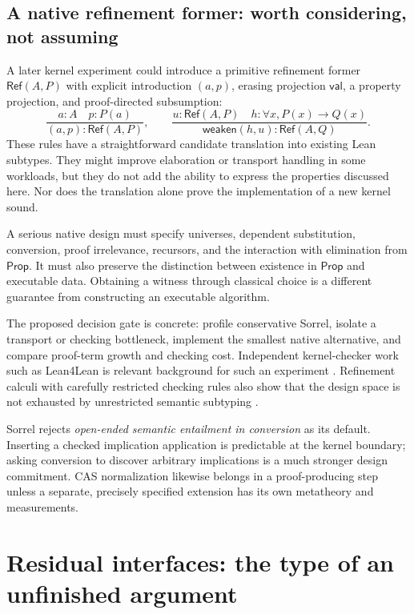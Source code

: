 \documentclass[11pt,a4paper]{article}
\newcommand{\Prop}{\mathsf{Prop}}\newcommand{\Type}{\mathsf{Type}}
\numberwithin{equation}{section}
\theoremstyle{definition}\newtheorem{definition}[theorem]{Definition}
\theoremstyle{remark}\newtheorem{remark}[theorem]{Remark}
\begin{document}
\subsection{A native refinement former: worth considering, not assuming}
A later kernel experiment could introduce a primitive refinement former
\(\mathsf{Ref}(A,P)\) with explicit introduction \((a,p)\), erasing projection
\(\mathsf{val}\), a property projection, and proof-directed subsumption:
\[
 \frac{a:A\quad p:P(a)}{(a,p):\mathsf{Ref}(A,P)},\qquad
 \frac{u:\mathsf{Ref}(A,P)\quad h:\forall x,P(x)\to Q(x)}
      {\mathsf{weaken}(h,u):\mathsf{Ref}(A,Q)}.
\]
These rules have a straightforward candidate translation into existing Lean
subtypes. They might improve elaboration or transport handling in some
workloads, but they do not add the ability to express the properties discussed
here. Nor does the translation alone prove the implementation of a new kernel
sound.

A serious native design must specify universes, dependent substitution,
conversion, proof irrelevance, recursors, and the interaction with elimination
from \(\Prop\). It must also preserve the distinction between existence in
\(\Prop\) and executable data. Obtaining a witness through classical choice
is a different guarantee from constructing an executable algorithm.

The proposed decision gate is concrete: profile conservative Sorrel, isolate a
transport or checking bottleneck, implement the smallest native alternative,
and compare proof-term growth and checking cost. Independent kernel-checker
work such as Lean4Lean is relevant background for such an experiment
\cite{lean4lean}. Refinement calculi with carefully restricted checking rules
also show that the design space is not exhausted by unrestricted semantic
subtyping \cite{lovas}.

Sorrel rejects \emph{open-ended semantic entailment in conversion} as its
default. Inserting a checked implication application is predictable at the
kernel boundary; asking conversion to discover arbitrary implications is a
much stronger design commitment. CAS normalization likewise belongs in a
proof-producing step unless a separate, precisely specified extension has
its own metatheory and measurements.

\section{Residual interfaces: the type of an unfinished argument}\label{sec:plans}
\end{document}
